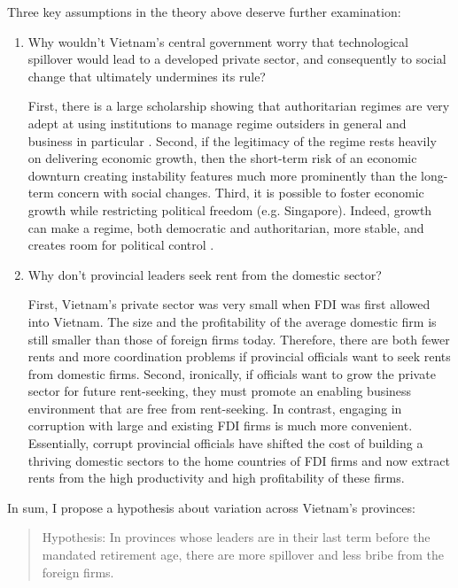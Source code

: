 Three key assumptions in the theory above deserve further examination:
\begin{enumerate}
\item Why wouldn't Vietnam's central government worry that technological spillover would lead to a developed private sector, and consequently to social change that ultimately undermines its rule?

First, there is a large scholarship showing that authoritarian regimes are very adept at using institutions to manage regime outsiders in general and business in particular \citep{Gandhi2006, Gandhi2008, Wright2008, Le2015}. Second, if the legitimacy of the regime rests heavily on delivering economic growth, then the short-term risk of an economic downturn creating instability features much more prominently than the long-term concern with social changes. Third, it is possible to foster economic growth while restricting political freedom (e.g. Singapore). Indeed, growth can make a regime, both democratic and authoritarian, more stable, and creates room for political control \citep{Przeworski1997}.

\item Why don't provincial leaders seek rent from the domestic sector? 

First, Vietnam's private sector was very small when FDI was first allowed into Vietnam. The size and the profitability of the average domestic firm is still smaller than those of foreign firms today. Therefore, there are both fewer rents and more coordination problems if provincial officials want to seek rents from domestic firms. Second, ironically, if officials want to grow the private sector for future rent-seeking, they must promote an enabling business environment that are free from rent-seeking. In contrast, engaging in corruption with large and existing FDI firms is much more convenient. Essentially, corrupt provincial officials have shifted the cost of building a thriving domestic sectors to the home countries of FDI firms and now extract rents from the high productivity and high profitability of these firms. 
\end{enumerate}

In sum, I propose a hypothesis about variation across Vietnam's provinces:

\begin{quote}
Hypothesis: In provinces whose leaders are in their last term before the mandated retirement age, there are more spillover and less bribe from the foreign firms.
\end{quote}

